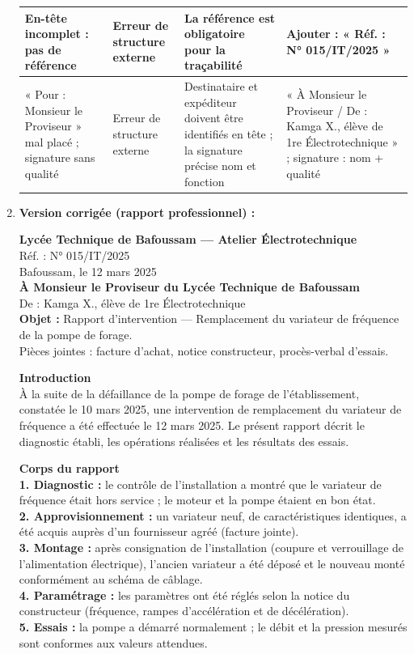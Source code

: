 \documentclass[11pt]{article}
\begin{document}
\begin{corrige}
\begin{enumerate}
\begin{center}
\begin{tabularx}{\linewidth}{|X|X|X|X|}
    En-tête incomplet : pas de référence & Erreur de structure externe & La référence est obligatoire pour la traçabilité & Ajouter : « Réf. : N° 015/IT/2025 » \\ \hline
    « Pour : Monsieur le Proviseur » mal placé ; signature sans qualité & Erreur de structure externe & Destinataire et expéditeur doivent être identifiés en tête ; la signature précise nom et fonction & « À Monsieur le Proviseur / De : Kamga X., élève de 1re Électrotechnique » ; signature : nom + qualité \\ \hline
    \end{tabularx}
    \end{center}
    \item \textbf{Version corrigée (rapport professionnel) :}

    \textbf{Lycée Technique de Bafoussam — Atelier Électrotechnique}\\
    Réf. : N° 015/IT/2025\\
    Bafoussam, le 12 mars 2025\\
    \textbf{À Monsieur le Proviseur du Lycée Technique de Bafoussam}\\
    De : Kamga X., élève de 1re Électrotechnique\\
    \textbf{Objet :} Rapport d'intervention — Remplacement du variateur de fréquence de la pompe de forage.\\
    Pièces jointes : facture d'achat, notice constructeur, procès-verbal d'essais.

    \textbf{Introduction}\\
    À la suite de la défaillance de la pompe de forage de l'établissement, constatée le 10 mars 2025, une intervention de remplacement du variateur de fréquence a été effectuée le 12 mars 2025. Le présent rapport décrit le diagnostic établi, les opérations réalisées et les résultats des essais.

    \textbf{Corps du rapport}\\
    \textbf{1. Diagnostic :} le contrôle de l'installation a montré que le variateur de fréquence était hors service ; le moteur et la pompe étaient en bon état.\\
    \textbf{2. Approvisionnement :} un variateur neuf, de caractéristiques identiques, a été acquis auprès d'un fournisseur agréé (facture jointe).\\
    \textbf{3. Montage :} après consignation de l'installation (coupure et verrouillage de l'alimentation électrique), l'ancien variateur a été déposé et le nouveau monté conformément au schéma de câblage.\\
    \textbf{4. Paramétrage :} les paramètres ont été réglés selon la notice du constructeur (fréquence, rampes d'accélération et de décélération).\\
    \textbf{5. Essais :} la pompe a démarré normalement ; le débit et la pression mesurés sont conformes aux valeurs attendues.


\end{enumerate}
\end{corrige}
\end{document}
